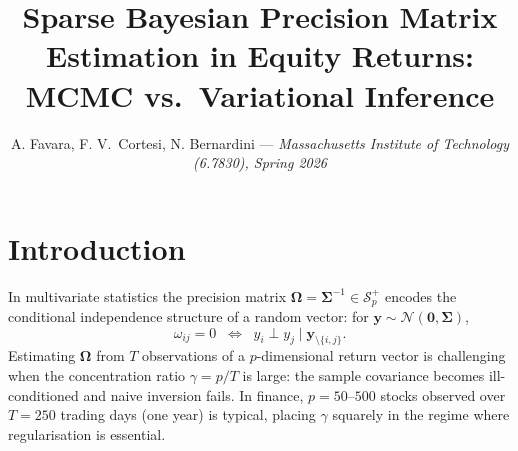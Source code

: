 \documentclass[10pt,conference,compsoc]{IEEEtran}
\title{\large \textbf{Sparse Bayesian Precision Matrix Estimation in Equity Returns:\\MCMC vs.\ Variational Inference}\vspace{-0.5em}}
\author{
    \small A. Favara, F. V.\ Cortesi, N. Bernardini --- \textit{Massachusetts Institute of Technology (6.7830), Spring 2026}\vspace{-5em}
}
\newcommand{\Normal}{\mathcal{N}} \newcommand{\HalfCauchy}{\mathrm{C}^{+}} \newcommand{\InvGamma}{\mathrm{IG}}
\newcommand{\Spp}{\mathcal{S}^{+}_p} \newcommand{\bOmega}{\bm{\Omega}} \newcommand{\bSigma}{\bm{\Sigma}}
\begin{document}

\titlespacing*{\section}{0pt}{1.2ex}{0.6ex}
\titlespacing*{\subsection}{0pt}{1.0ex}{0.5ex}
\titlespacing*{\subsubsection}{0pt}{0.8ex}{0.4ex}
\titleformat{\paragraph}[runin]{\normalfont\bfseries}{}{0pt}{}
\titlespacing{\paragraph}{0pt}{0.5ex}{1em}

\maketitle
\setlength{\parskip}{0pt}

\section{Introduction}

In multivariate statistics the precision matrix $\bOmega = \bSigma^{-1} \in \Spp$ encodes the conditional independence structure of a random vector: for $\bm{y} \sim \Normal(\bm{0}, \bSigma)$,
\begin{equation}
  \omega_{ij} = 0 \;\;\Longleftrightarrow\;\; y_i \perp y_j \mid \bm{y}_{\setminus\{i,j\}}.
  \label{eq:cond-indep}
\end{equation}
Estimating $\bOmega$ from $T$ observations of a $p$-dimensional return vector is challenging when the concentration ratio $\gamma = p/T$ is large: the sample covariance becomes ill-conditioned and naive inversion fails. In finance, $p = 50$--$500$ stocks observed over $T = 250$ trading days (one year) is typical, placing $\gamma$ squarely in the regime where regularisation is essential.
\end{document}
